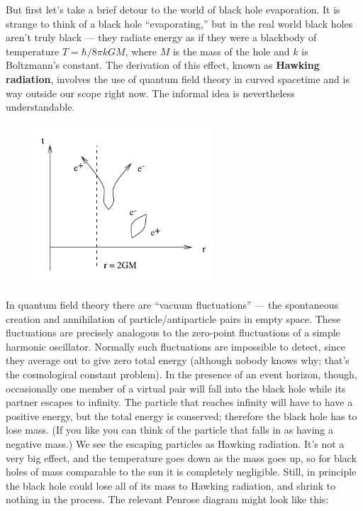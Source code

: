\documentclass[12pt]{article}
\begin{document}
But first let's take a brief detour to the world of black
hole evaporation.
It is strange to think of a black hole ``evaporating,'' but in
the real world black holes aren't truly black --- they radiate
energy as if they were a blackbody of temperature $T=\hbar/8\pi
kGM$, where $M$ is the mass of the hole and $k$ is Boltzmann's
constant.  The derivation of this effect, known as {\bf Hawking
radiation}, involves the use of quantum field theory in curved
spacetime and is way outside our scope right now.  The informal
idea is nevertheless understandable.  
\begin{figure}[b]
  \centerline{
  \includegraphics[height=6cm]{pdf/seven26}}
\end{figure}
In quantum field theory
there are ``vacuum fluctuations'' --- the spontaneous creation and
annihilation of particle/antiparticle pairs in empty space.  
These fluctuations are precisely analogous to the zero-point
fluctuations of a simple harmonic oscillator.  Normally such
fluctuations are impossible to detect, since they average out
to give zero total energy (although nobody knows why; that's
the cosmological constant problem).  In the presence of an event
horizon, though, occasionally one member of a virtual pair will
fall into the black hole while its partner escapes to infinity.
The particle that reaches infinity will have to have a positive
energy, but the total energy is conserved; therefore the black
hole has to lose mass.  (If you like you can think of the particle
that falls in as having a negative mass.)  
We see the escaping particles as Hawking radiation.
It's not a very big effect, and the temperature goes down as the
mass goes up, so for black holes of mass comparable to the sun it
is completely negligible.  Still, in principle the black hole could
lose all of its mass to Hawking radiation, and shrink to nothing in
the process.  The relevant Penrose diagram might look like this:
\end{document}
